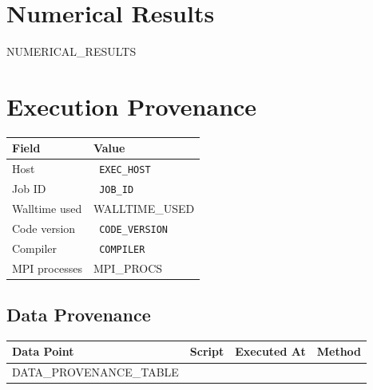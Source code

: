 \documentclass[11pt,a4paper]{article}
\begin{document}

\section{Numerical Results}

{{NUMERICAL_RESULTS}}


\section{Execution Provenance}

\begin{infobox}
\begin{tabularx}{\linewidth}{@{}>{\raggedright\arraybackslash}p{3.5cm} >{\raggedright\arraybackslash}X@{}}
\toprule
\textbf{Field} & \textbf{Value} \\
\midrule
Host            & \texttt{ {{EXEC_HOST}} } \\
Job ID          & \texttt{ {{JOB_ID}} } \\
Walltime used   & {{WALLTIME_USED}} \\
Code version    & \texttt{ {{CODE_VERSION}} } \\
Compiler        & \texttt{ {{COMPILER}} } \\
MPI processes   & {{MPI_PROCS}} \\
\bottomrule
\end{tabularx}
\end{infobox}

\subsection{Data Provenance}

\begin{longtable}{>{\raggedright}p{2.5cm} p{3cm} p{2cm} p{4.5cm}}
\toprule
\textbf{Data Point} & \textbf{Script} & \textbf{Executed At} & \textbf{Method} \\
\midrule
\endhead
{{DATA_PROVENANCE_TABLE}}
\bottomrule
\end{longtable}

\end{document}
